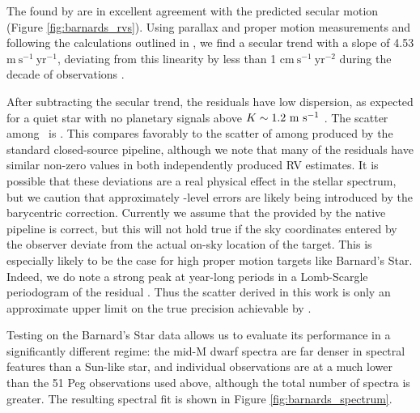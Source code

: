 \documentclass[modern]{aastex62}
\newcommand{\Mdwarf}{Barnard's Star\xspace} %
\begin{document}
The \RVs found by \wobble are in excellent agreement with the predicted secular motion (Figure \ref{fig:barnards_rvs}). 
Using \gaia parallax and proper motion measurements and following the calculations outlined in \citet{Kurster2003}, we find a secular trend with a slope of 4.53 $\mathrm{m}~\mathrm{s}^{-1}~\mathrm{yr}^{-1}$, deviating from this linearity by less than 1 $\mathrm{cm}~\mathrm{s}^{-1}~\mathrm{yr}^{-2}$ during the decade of \HARPS observations \citep{gaia2016, gaia2018}. 

After subtracting the secular \RV trend, the residuals have low dispersion, as expected for a quiet star with no planetary signals above $K \sim 1.2~\mathrm{m}~\mathrm{s}^{-1}$ \citep{Choi2013, Ribas2018}. 
The  scatter among \wobble\ \RVs is  \ms. 
This compares favorably to the scatter of  \ms among \RVs produced by the standard closed-source \HARPS pipeline, although we note that many of the residuals have similar non-zero values in both independently produced RV estimates. 
It is possible that these deviations are a real physical effect in the stellar spectrum, but we caution that approximately \ms-level errors are likely being introduced by the barycentric correction. 
Currently we assume that the \BERV provided by the native \HARPS pipeline is correct, but this will not hold true if the sky coordinates entered by the observer deviate from the actual on-sky location of the target. 
This is especially likely to be the case for high proper motion targets like \Mdwarf. 
Indeed, we do note a strong peak at year-long periods in a Lomb-Scargle periodogram of the residual \RVs. 
Thus the \RV scatter derived in this work is only an approximate upper limit on the true precision achievable by \wobble. 

Testing \wobble on the \Mdwarf data allows us to evaluate its performance in a significantly different regime: the mid-M dwarf spectra are far denser in spectral features than a Sun-like star, and individual observations are at a much lower \SNR than the 51 Peg observations used above, although the total number of spectra is greater. 
The resulting spectral fit is shown in Figure \ref{fig:barnards_spectrum}.
\end{document}
